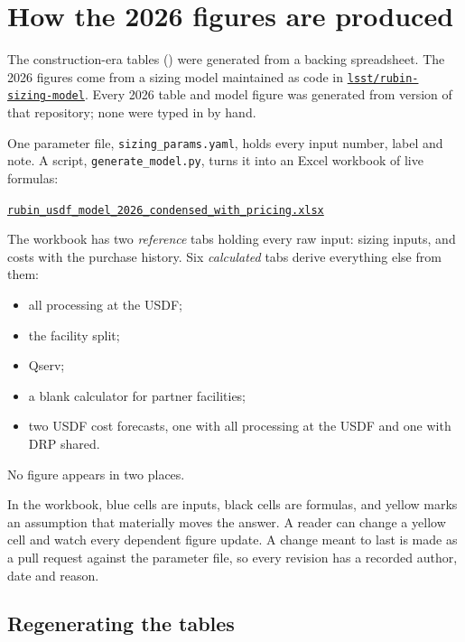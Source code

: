 \section{How the 2026 figures are produced}\label{sec:upmodel}

The construction-era tables () were generated from a
backing spreadsheet. The 2026 figures come from a sizing model maintained as code in
\href{https://github.com/lsst/rubin-sizing-model/tree/\smSourceRef}{\texttt{lsst/rubin-sizing-model}}.
Every 2026 table and model figure was generated from version
\texttt{\smSourceRef} of that repository; none were typed in by hand.

One parameter file, \texttt{sizing\_params.yaml}, holds every input number,
label and note. A script, \texttt{generate\_model.py}, turns it into an Excel
workbook of live formulas:
\begin{center}
\small\href{https://github.com/lsst/rubin-sizing-model/blob/\smSourceRef/rubin_usdf_model_2026_condensed_with_pricing.xlsx}{\texttt{rubin\_usdf\_model\_2026\_condensed\_with\_pricing.xlsx}}
\end{center}
The workbook has two \emph{reference} tabs holding every raw input: sizing
inputs, and costs with the purchase history. Six \emph{calculated} tabs
derive everything else from them:
\begin{itemize}
\item all processing at the USDF;
\item the facility split;
\item Qserv;
\item a blank calculator for partner facilities;
\item two USDF cost forecasts, one with all processing at the USDF and one
      with DRP shared.
\end{itemize}
No figure appears in two places.

In the workbook, blue cells are inputs, black cells are formulas, and yellow
marks an assumption that materially moves the answer. A reader can change a
yellow cell and watch every dependent figure update. A change meant to last is
made as a pull request against the parameter file, so every revision has a
recorded author, date and reason.

\subsection{Regenerating the tables}\label{sec:upregen}

